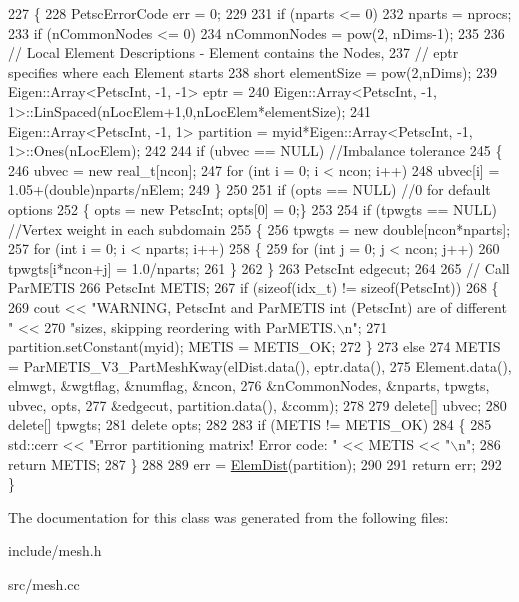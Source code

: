\begin{DoxyCode}
227 \{
228   PetscErrorCode err = 0;
229 
231   \textcolor{keywordflow}{if} (nparts <= 0)
232     nparts = nprocs;
233   \textcolor{keywordflow}{if} (nCommonNodes <= 0)
234     nCommonNodes = pow(2, nDims-1);
235 
236   \textcolor{comment}{// Local Element Descriptions - Element contains the Nodes,}
237   \textcolor{comment}{// eptr specifies where each Element starts}
238   \textcolor{keywordtype}{short} elementSize = pow(2,nDims);
239   Eigen::Array<PetscInt, -1, -1> eptr =
240     Eigen::Array<PetscInt, -1, 1>::LinSpaced(nLocElem+1,0,nLocElem*elementSize);
241   Eigen::Array<PetscInt, -1, 1> partition = myid*Eigen::Array<PetscInt, -1, 1>::Ones(nLocElem);
242 
244   \textcolor{keywordflow}{if} (ubvec == NULL)                            \textcolor{comment}{//Imbalance tolerance}
245   \{
246     ubvec = \textcolor{keyword}{new} real\_t[ncon];
247     \textcolor{keywordflow}{for} (\textcolor{keywordtype}{int} i = 0; i < ncon; i++)
248       ubvec[i] = 1.05+(\textcolor{keywordtype}{double})nparts/nElem;
249   \}
250 
251   \textcolor{keywordflow}{if} (opts == NULL)                         \textcolor{comment}{//0 for default options}
252   \{ opts = \textcolor{keyword}{new} PetscInt; opts[0] = 0;\}
253 
254   \textcolor{keywordflow}{if} (tpwgts == NULL)                \textcolor{comment}{//Vertex weight in each subdomain}
255   \{
256     tpwgts = \textcolor{keyword}{new} \textcolor{keywordtype}{double}[ncon*nparts];
257     \textcolor{keywordflow}{for} (\textcolor{keywordtype}{int} i = 0; i < nparts; i++)
258     \{
259       \textcolor{keywordflow}{for} (\textcolor{keywordtype}{int} j = 0; j < ncon; j++)
260         tpwgts[i*ncon+j] = 1.0/nparts;
261     \}
262   \}
263   PetscInt edgecut;
264 
265   \textcolor{comment}{// Call ParMETIS}
266   PetscInt METIS;
267   \textcolor{keywordflow}{if} (\textcolor{keyword}{sizeof}(idx\_t) != \textcolor{keyword}{sizeof}(PetscInt))
268   \{
269     cout << \textcolor{stringliteral}{"WARNING, PetscInt and ParMETIS int (PetscInt) are of different "} <<
270             \textcolor{stringliteral}{"sizes, skipping reordering with ParMETIS.\(\backslash\)n"};
271     partition.setConstant(myid); METIS = METIS\_OK;
272   \}
273   \textcolor{keywordflow}{else}
274     METIS = ParMETIS\_V3\_PartMeshKway(elDist.data(), eptr.data(),
275             Element.data(), elmwgt, &wgtflag, &numflag, &ncon,
276             &nCommonNodes, &nparts, tpwgts, ubvec, opts,
277             &edgecut, partition.data(), &comm);
278   
279   \textcolor{keyword}{delete}[] ubvec;
280   \textcolor{keyword}{delete}[] tpwgts;
281   \textcolor{keyword}{delete} opts;
282 
283   \textcolor{keywordflow}{if} (METIS != METIS\_OK)
284   \{
285     std::cerr << \textcolor{stringliteral}{"Error partitioning matrix! Error code: "} << METIS << \textcolor{stringliteral}{"\(\backslash\)n"};
286     \textcolor{keywordflow}{return} METIS;
287   \}
288 
289   err = \mbox{\hyperlink{class_mesh_a1c915802d56c4ded24e460e83cfb5399}{ElemDist}}(partition);
290 
291   \textcolor{keywordflow}{return} err;
292 \}
\end{DoxyCode}


The documentation for this class was generated from the following files\+:\begin{DoxyCompactItemize}
\item 
include/mesh.\+h\item 
src/mesh.\+cc\end{DoxyCompactItemize}
